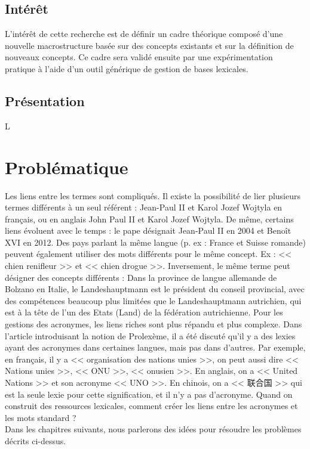 \documentclass[10pt,a4paper,twoside]{article}
\newcommand{\Chinois}[1]{{\fontspec[Scale=0.9]{STSong}#1}}
\begin{document}
\subsection{Intérêt}

L'intérêt de cette recherche est de définir un cadre théorique composé d'une nouvelle macrostructure basée sur des concepts existants et sur la définition de nouveaux concepts. Ce cadre sera validé ensuite par une expérimentation pratique à l'aide d'un outil générique de gestion de bases lexicales.

\subsection{Présentation}

L

\section{Problématique}

Les liens entre les termes sont compliqués. Il existe la possibilité de lier plusieurs termes différents à un seul référent : Jean-Paul II et Karol Jozef Wojtyla en français, ou en anglais John Paul II et Karol Jozef Wojtyla. De même, certains liens évoluent avec le temps : le pape désignait Jean-Paul II en 2004 et Benoît XVI en 2012. Des pays parlant la même langue (p. ex : France et Suisse romande) peuvent également utiliser des mots différents pour le même concept. Ex : << chien renifleur >> et << chien drogue >>. Inversement, le même terme peut désigner des concepts différents : Dans la province de langue allemande de Bolzano en Italie, le Landeshauptmann est le président du conseil provincial, avec des compétences beaucoup plus limitées que le Landeshauptmann autrichien, qui est à la tête de l'un des Etats (Land) de la fédération autrichienne.
Pour les gestions des acronymes, les liens riches sont plus répandu et plus complexe. Dans l'article introduisant la notion de Prolexème, il a été discuté qu’il y a des lexies ayant des acronymes dans certaines langues, mais pas dans d'autres. Par exemple, en français, il y a << organisation des nations unies >>, on peut aussi dire << Nations unies >>, << ONU >>, << onusien >>. En anglais, on a << United Nations >> et son acronyme << UNO >>. En chinois, on a << \Chinois{联合国} >> qui est la seule lexie pour cette signification, et il n’y a pas d'acronyme. Quand on construit des ressources lexicales, comment créer les liens entre les acronymes et les mots standard ?\\
Dans les chapitres suivants, nous parlerons des idées pour résoudre les problèmes décrits ci-dessus. 
\end{document}
